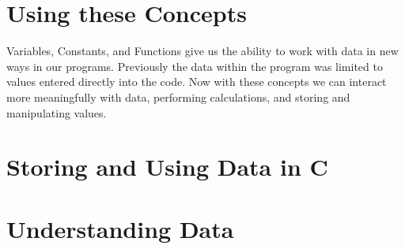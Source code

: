 \clearpage
\section{Using these Concepts} %
\label{sec:using_these_concepts_storing_using_data}

Variables, Constants, and Functions give us the ability to work with data in new ways in our programs. Previously the data within the program was limited to values entered directly into the code. Now with these concepts we can interact more meaningfully with data, performing calculations, and storing and manipulating values.







\clearpage
\def\pageLang{c}
\section{Storing and Using Data in C} %
\label{sec:storing_and_using_data_in_c}





% 












\clearpage
\def\pageLang{none}
\section{Understanding Data} %
\label{sec:understanding_dat}

